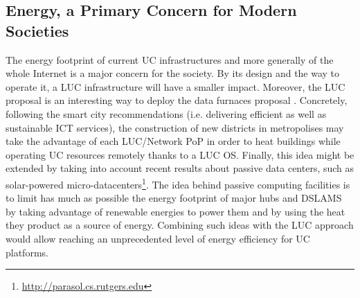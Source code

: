 \subsection{Energy, a Primary Concern for Modern Societies}

The energy footprint of current UC infrastructures and more generally of the
whole Internet is a major concern for the society.  By its design and the way
to operate it, a LUC infrastructure will have a smaller impact.
 Moreover, the LUC proposal is an interesting way to
deploy the data furnaces proposal \cite{liu:hotcloud11}.  Concretely, following
the smart city recommendations (i.e. delivering efficient as well as
sustainable ICT services), the construction of new districts in metropolises
may take the advantage of each LUC/Network PoP in order to heat buildings while
operating UC resources remotely thanks to a LUC OS. Finally, this idea might
be extended by taking into account recent results about passive data centers,
such as solar-powered
micro-datacenters\footnote{\href{http://parasol.cs.rutgers.edu}{\url{http://parasol.cs.rutgers.edu}}}.
The idea behind passive computing facilities is to limit has much as possible
the energy footprint of major hubs and DSLAMS by taking advantage of renewable
energies to power them and by using the heat they product as a source of
energy. Combining such ideas with the LUC approach would allow reaching an
unprecedented level of energy efficiency for UC platforms.

